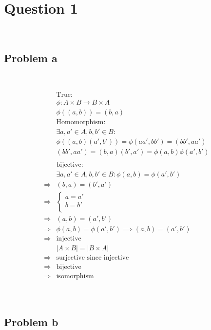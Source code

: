 \documentclass{article}
\begin{document}
\section*{Question 1}

~

\subsection*{Problem a}

~

\begin{equation*}
    \begin{split}
        &\text{True}:\\
        &\phi:A\times B\rightarrow B\times A\\
        &\phi((a,b))=(b,a)\\
        &\text{Homomorphism}:\\
        &\exists a,a'\in A,b,b'\in B:\\
        &\phi((a,b)(a',b'))=\phi(aa',bb')=(bb',aa')\\
        &(bb',aa')=(b,a)(b',a')=\phi(a,b)\phi(a',b')\\
        &\\
        &\text{bijective}:\\
        &\exists a,a'\in A,b,b'\in B:\phi(a,b)=\phi(a',b')\\
        \Rightarrow&(b,a)=(b',a')\\
        \Rightarrow&\begin{cases}
            a=a'\\
            b=b'\\
        \end{cases}\\
        \Rightarrow&(a,b)=(a',b')\\
        \Rightarrow&\phi(a,b)=\phi(a',b')\implies (a,b)=(a',b')\\
        \Rightarrow&\text{injective}\\
        &|A\times B|=|B\times A|\\
        \Rightarrow&\text{surjective since injective}\\
        \Rightarrow&\text{bijective}\\
        \Rightarrow&\text{isomorphism}\\
    \end{split}
\end{equation*}

~

\subsection*{Problem b}
\end{document}
